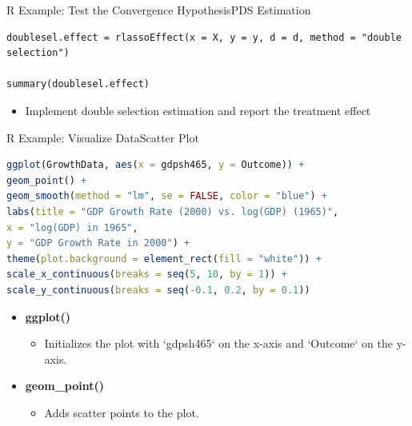 \documentclass[dvipsnames,hyperref={pdfpagelabels=false}]{beamer}
\begin{document}
\begin{frame}[fragile]{R Example: Test the Convergence Hypothesis}{PDS Estimation}
		
\begin{lstlisting}
doublesel.effect = rlassoEffect(x = X, y = y, d = d, method = "double selection")

summary(doublesel.effect)
\end{lstlisting}
		
	\begin{itemize}
		\item Implement double selection estimation and report the treatment effect
		
		
	\end{itemize}
\end{frame}





\begin{frame}[fragile]{R Example: Visualize Data}{Scatter Plot}
\begin{lstlisting}[language=R]
ggplot(GrowthData, aes(x = gdpsh465, y = Outcome)) +
geom_point() +
geom_smooth(method = "lm", se = FALSE, color = "blue") +
labs(title = "GDP Growth Rate (2000) vs. log(GDP) (1965)",
x = "log(GDP) in 1965",
y = "GDP Growth Rate in 2000") +
theme(plot.background = element_rect(fill = "white")) +
scale_x_continuous(breaks = seq(5, 10, by = 1)) +
scale_y_continuous(breaks = seq(-0.1, 0.2, by = 0.1))
\end{lstlisting}
	
	\begin{itemize}
		\item \textbf{ggplot()} 
				\vspace{0.2cm}
		\begin{itemize}
			\item Initializes the plot with `gdpsh465` on the x-axis and `Outcome` on the y-axis.
		\end{itemize}
		\vspace{0.2cm}
		\item \textbf{geom\_point()} 
						\vspace{0.2cm}
		\begin{itemize}
			\item Adds scatter points to the plot.
		\end{itemize}
		
	\end{itemize}
\end{frame}
\end{document}
